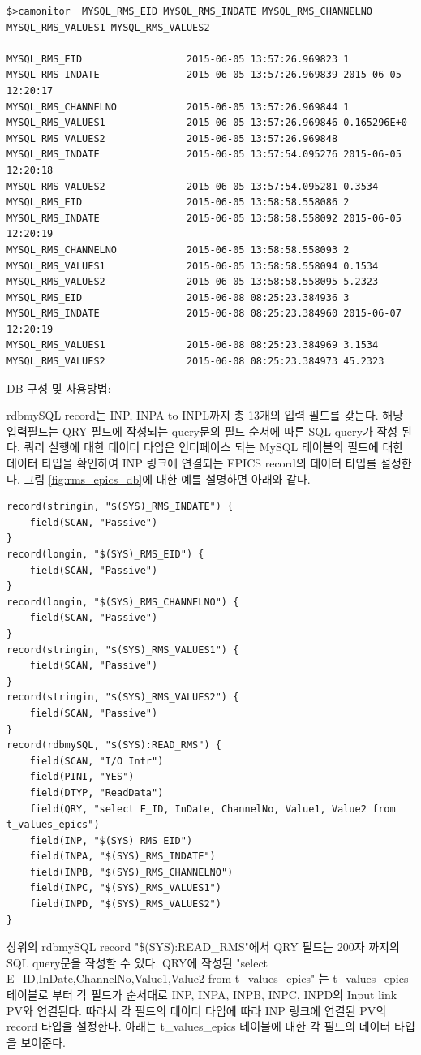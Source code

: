 \documentclass[11pt
  , a4paper
  , article
  , oneside
]{memoir}
\begin{document}
\begin{lstlisting}[style=termstyle]
$>camonitor  MYSQL_RMS_EID MYSQL_RMS_INDATE MYSQL_RMS_CHANNELNO MYSQL_RMS_VALUES1 MYSQL_RMS_VALUES2

MYSQL_RMS_EID                  2015-06-05 13:57:26.969823 1  
MYSQL_RMS_INDATE               2015-06-05 13:57:26.969839 2015-06-05 12:20:17  
MYSQL_RMS_CHANNELNO            2015-06-05 13:57:26.969844 1  
MYSQL_RMS_VALUES1              2015-06-05 13:57:26.969846 0.165296E+0  
MYSQL_RMS_VALUES2              2015-06-05 13:57:26.969848   
MYSQL_RMS_INDATE               2015-06-05 13:57:54.095276 2015-06-05 12:20:18  
MYSQL_RMS_VALUES2              2015-06-05 13:57:54.095281 0.3534  
MYSQL_RMS_EID                  2015-06-05 13:58:58.558086 2  
MYSQL_RMS_INDATE               2015-06-05 13:58:58.558092 2015-06-05 12:20:19  
MYSQL_RMS_CHANNELNO            2015-06-05 13:58:58.558093 2  
MYSQL_RMS_VALUES1              2015-06-05 13:58:58.558094 0.1534  
MYSQL_RMS_VALUES2              2015-06-05 13:58:58.558095 5.2323  
MYSQL_RMS_EID                  2015-06-08 08:25:23.384936 3  
MYSQL_RMS_INDATE               2015-06-08 08:25:23.384960 2015-06-07 12:20:19  
MYSQL_RMS_VALUES1              2015-06-08 08:25:23.384969 3.1534  
MYSQL_RMS_VALUES2              2015-06-08 08:25:23.384973 45.2323  
\end{lstlisting}

DB 구성 및 사용방법:

rdbmySQL record는 INP, INPA to INPL까지 총 13개의 입력 필드를 갖는다. 해당 입력필드는 QRY 필드에 작성되는 query문의 필드 순서에 따른 SQL query가 작성 된다. 쿼리 실행에 대한 데이터 타입은 인터페이스 되는 MySQL 테이블의 필드에 대한 데이터 타입을 확인하여 INP 링크에 연결되는 EPICS record의 데이터 타입를 설정한다. 그림 \ref{fig:rms_epics_db}에 대한 예를 설명하면 아래와 같다.

\begin{lstlisting}[style=termstyle]
record(stringin, "$(SYS)_RMS_INDATE") {
	field(SCAN, "Passive")
}
record(longin, "$(SYS)_RMS_EID") {
	field(SCAN, "Passive")
}
record(longin, "$(SYS)_RMS_CHANNELNO") {
	field(SCAN, "Passive")
}
record(stringin, "$(SYS)_RMS_VALUES1") {
	field(SCAN, "Passive")
}
record(stringin, "$(SYS)_RMS_VALUES2") {
	field(SCAN, "Passive")
}
record(rdbmySQL, "$(SYS):READ_RMS") {
	field(SCAN, "I/O Intr")
	field(PINI, "YES")
	field(DTYP, "ReadData")
	field(QRY, "select E_ID, InDate, ChannelNo, Value1, Value2 from t_values_epics")
	field(INP, "$(SYS)_RMS_EID")
	field(INPA, "$(SYS)_RMS_INDATE")
	field(INPB, "$(SYS)_RMS_CHANNELNO")
	field(INPC, "$(SYS)_RMS_VALUES1")
	field(INPD, "$(SYS)_RMS_VALUES2")
}
\end{lstlisting}
상위의 rdbmySQL record "\$(SYS):READ\_RMS"에서 QRY 필드는 200자 까지의 SQL query문을 작성할 수 있다.  QRY에 작성된 "select E\_ID,InDate,ChannelNo,Value1,Value2 from t\_values\_epics" 는  t\_values\_epics 테이블로 부터 각 필드가 순서대로 INP, INPA, INPB, INPC, INPD의 Input link PV와 연결된다. 따라서 각 필드의 데이터 타입에 따라 INP 링크에 연결된 PV의 record 타입을 설정한다. 아래는 t\_values\_epics 테이블에 대한 각 필드의 데이터 타입을 보여준다.
\end{document}
